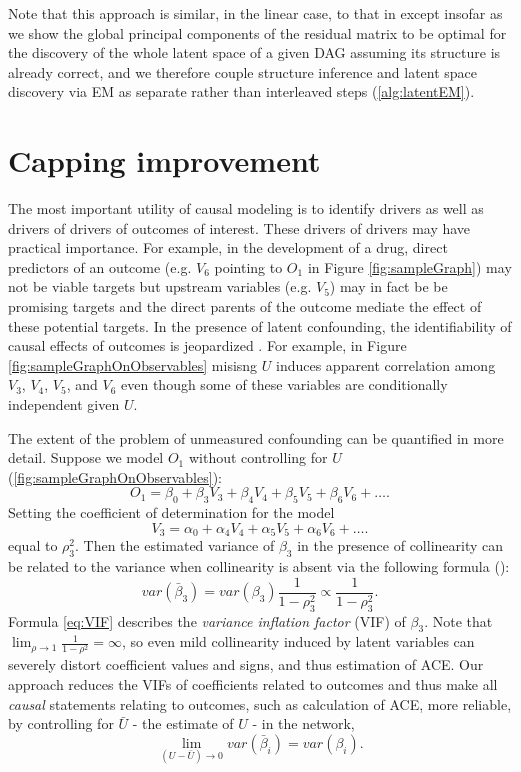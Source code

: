 \documentclass{article}
\begin{document}
Note that this approach is similar, in the linear case, to that in \cite{elidan_ideal_2007} except insofar as we show the global principal components of the residual matrix to be optimal for the discovery of the whole latent space of a given DAG assuming its structure is already correct, and we therefore couple structure inference and latent space discovery via EM as separate rather than interleaved steps (\ref{alg:latentEM}).

\section{Capping improvement}

The most important utility of causal modeling is to identify drivers as well as drivers of drivers of outcomes of interest.  These drivers of drivers may have practical importance. For example, in the development of a drug, direct predictors of an outcome (e.g. $V_6$ pointing to $O_{1}$ in Figure \ref{fig:sampleGraph}) may not be viable targets but upstream variables (e.g. $V_{5}$) may in fact be be promising targets and the direct parents of the outcome mediate the effect of these potential targets. In the presence of latent confounding, the identifiability of causal effects of outcomes is jeopardized \cite{hernan_estimating_2006}.  For example, in Figure \ref{fig:sampleGraphOnObservables} misisng $U$ induces apparent correlation among $V_3$, $V_4$, $V_5$, and $V_6$ even though some of these variables are conditionally independent given $U$.  

The extent of the problem of unmeasured confounding can be quantified in more detail.  Suppose we model $O_1$ without controlling for $U$ (\ref{fig:sampleGraphOnObservables}): $$O_1 = \beta_0 + \beta_3 V_3 + \beta_4 V_4 + \beta_5 V_5 + \beta_6 V_6 + \dots.$$  Setting the coefficient of determination for the model $$V_3 = \alpha_0 + \alpha_4 V_4 + \alpha_5 V_5 + \alpha_6 V_6 + \dots.$$ equal to $\rho_3^2$.  Then the estimated variance of $\beta_3$ in the presence of collinearity can be related to the variance when collinearity is absent via the following formula (\cite{rawlings_applied_1998}):
\begin{equation}
var(\bar{\beta}_3) = var(\beta_3) \frac{1}{1-\rho_3^2} \propto \frac{1}{1-\rho_3^2}.
\label{eq:VIF}
\end{equation}
Formula \ref{eq:VIF} describes the \textit{variance inflation factor} (VIF) of $\beta_3$.  Note that $\lim_{\rho \to 1} \frac{1}{1-\rho^2} = \infty$, so even mild collinearity induced by latent variables can severely distort coefficient values and signs, and thus estimation of ACE.  Our approach reduces the VIFs of coefficients related to outcomes and thus make all \textit{causal} statements relating to outcomes, such as calculation of ACE, more reliable, by controlling for $\bar{U}$ - the estimate of $U$ - in the network,
\begin{equation}
\lim_{(U - \bar{U})\to0} var(\bar{\beta}_i) = var(\beta_i).
\label{eq:vifImprovement}
\end{equation}
\end{document}
